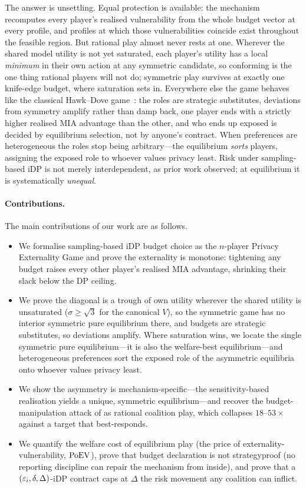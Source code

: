 The answer is unsettling. Equal protection is available: the
mechanism recomputes every player's realised vulnerability from the
whole budget vector at every profile, and profiles at which those
vulnerabilities coincide exist throughout the feasible region. But
rational play almost never rests at one. Wherever the shared model
utility is not yet saturated, each player's utility has a local
\emph{minimum} in their own action at any symmetric candidate, so
conforming is the one thing rational players will not do; symmetric
play survives at exactly one knife-edge budget, where saturation
sets in. Everywhere else the game behaves like the classical
Hawk--Dove game~\cite{maynardsmith1973logic}: the roles are
strategic substitutes, deviations from symmetry amplify rather than
damp back, one player ends with a strictly higher realised \ac{MIA}
advantage than the other, and who ends up exposed is decided by
equilibrium selection, not by anyone's contract. When preferences are
heterogeneous the roles stop being arbitrary---the equilibrium
\emph{sorts} players, assigning the exposed role to whoever values
privacy least. Risk under sampling-based \ac{iDP} is not merely
interdependent, as prior work observed; at equilibrium it is
systematically \emph{unequal}.

\paragraph{Contributions.} The main contributions of our work are as
follows.
\begin{itemize}
\item We formalise sampling-based \ac{iDP} budget choice as the $n$-player
  Privacy Externality Game and prove the externality is monotone:
  tightening any budget raises every other player's realised \ac{MIA}
  advantage, shrinking their slack below the \ac{DP} ceiling.
\item We prove the diagonal is a trough of own utility wherever the
  shared utility is unsaturated ($\sigma \geq \sqrt 3$ for the
  canonical $V$), so the symmetric game has no interior symmetric
  pure equilibrium there, and budgets are strategic substitutes, so
  deviations amplify. Where saturation wins, we locate the single
  symmetric pure equilibrium---it is also the welfare-best
  equilibrium---and heterogeneous preferences sort the exposed role
  of the asymmetric equilibria onto whoever values privacy least.
\item We show the asymmetry is mechanism-specific---the
  sensitivity-based realisation yields a unique, symmetric
  equilibrium---and recover the budget-manipulation attack of
  \citet{kaiser2026your} as rational coalition play, which collapses
  $18$--$53\times$ against a target that best-responds.
\item We quantify the welfare cost of equilibrium play (the price of
  externality-vulnerability, $\mathrm{PoEV}$),
  prove that budget declaration is not strategyproof (no reporting
  discipline can repair the mechanism from inside), and prove that a
  $(\varepsilon_i, \delta, \Delta)$-iDP contract caps at $\Delta$ the risk
  movement any coalition can inflict.
\end{itemize}

